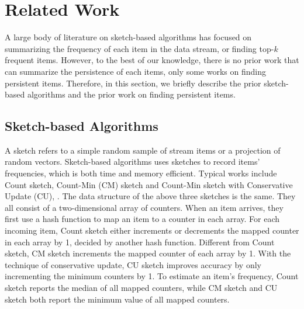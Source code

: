 \presec
\section{Related Work} \postsec
\label{sec:relate}
A large body of literature on sketch-based algorithms has focused on summarizing the frequency of each item in the data stream, or finding top-$k$ frequent items.
However, to the best of our knowledge, there is no prior work that can summarize the persistence of each items, only some works on finding persistent items. 
Therefore, in this section, we briefly describe the prior sketch-based algorithms and the prior work on finding persistent items.


\presub
\subsection{Sketch-based Algorithms}
\postsub
\label{subsec:relae:sketch}
A sketch refers to a simple random sample of stream items or a projection of random vectors.
Sketch-based algorithms uses sketches to record items' frequencies, which is both time and memory efficient.
Typical works include Count sketch\cite{countsketch}, Count-Min (CM) sketch\cite{cmsketch} and Count-Min sketch with Conservative Update (CU)\cite{cusketch}, \etc.
The data structure of the above three sketches is the same. 
They all consist of a two-dimensional array of counters.
When an item arrives, they first use a hash function to map an item to a counter in each array.
For each incoming item, Count sketch either increments or decrements the mapped counter in each array by 1, decided by another hash function.
Different from Count sketch, CM sketch increments the mapped counter of each array by 1.
With the technique of conservative update, CU sketch improves accuracy by only incrementing the minimum counters by 1.
To estimate an item's frequency, Count sketch reports the median of all mapped counters, while CM sketch and CU sketch both report the minimum value of all mapped counters.

